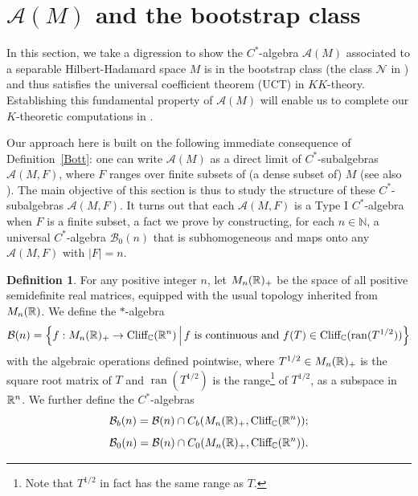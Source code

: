 \documentclass[11pt]{article}
\theoremstyle{definition}
\newtheorem{Def}{Definition}[section]
\theoremstyle{plain}
\def\A{\mathcal A}\def\C{\mathcal C}\def\B{\mathcal B}\def\E{\mathcal E}\def\O{\mathcal O}\def\h{\mathfrak h}\def\K{\mathcal K}\def\F{\mathcal F}\def\P{\mathcal P}\def\L{\mathcal L}\def\R{\mathcal R}\def\Q{\mathcal Q}\def\H{\mathcal H}\def\S{\mathcal S}\def\N{\mathcal N}\def\U{\mathcal U}\def\V{\mathcal V}
\def\Cl{\textup{Cliff}_{\IC}}
\begin{document}
\section{$\A(M)$ and the bootstrap class}\label{Sec: Approximating AofM}

In this section, we take a digression to show the $C^*$-algebra $\A(M)$ associated to a separable Hilbert-Hadamard space $M$ is in the bootstrap class (the class $\N$ in \cite{Duke1987}) and thus satisfies the universal coefficient theorem (UCT) in $KK$-theory. 
Establishing this fundamental property of $\A(M)$ will enable us to complete our $K$-theoretic computations in . 

Our approach here is built on the following immediate consequence of Definition~\ref{Bott}: one can write $\A(M)$ as a direct limit of $C^*$-subalgebras $\A(M,F)$, where $F$ ranges over finite subsets of (a dense subset of) $M$ (see also \cite[Lemma~7.2]{GWY2018}). 
The main objective of this section is thus to study the structure of these $C^*$-subalgebras $\A(M, F)$. 
It turns out that each $\A(M,F)$ is a Type I $C^*$-algebra when $F$ is a finite subset, a fact we prove by constructing, for each $n \in \mathbb{N}$, a universal $C^*$-algebra $\B_0(n)$ that is subhomogeneous and maps onto any $\A(M, F)$ with $|F| = n$.


\begin{Def}
For any positive integer $n$, let $M_n(\mathbb R)_+$ be the space of all positive semidefinite real matrices, equipped with the usual topology inherited from $M_n(\mathbb R)$. We define the $*$-algebra
$$\B(n)=\left\{f:M_n(\IR)_+\to\Cl(\IR^n)\,\Big|\, f\text{ is continuous and }f(T)\in\Cl(\operatorname{ran}(T^{1/2}))\right\}$$
with the algebraic operations defined pointwise, where $T^{1/2}\in M_n(\mathbb R)_+$ is the square root matrix of $T$ and $\operatorname{ran}(T^{1/2})$ is the range\footnote{Note that $T^{1/2}$ in fact has the same range as $T$. } of $T^{1/2}$, as a subspace in $\mathbb R^n$. We further define the $C^*$-algebras
$$\B_b(n)=\B(n)\cap C_b(M_n(\IR)_+,\Cl(\IR^n));$$
$$\B_0(n)=\B(n)\cap C_0(M_n(\IR)_+,\Cl(\IR^n)).$$
\end{Def}
\end{document}
